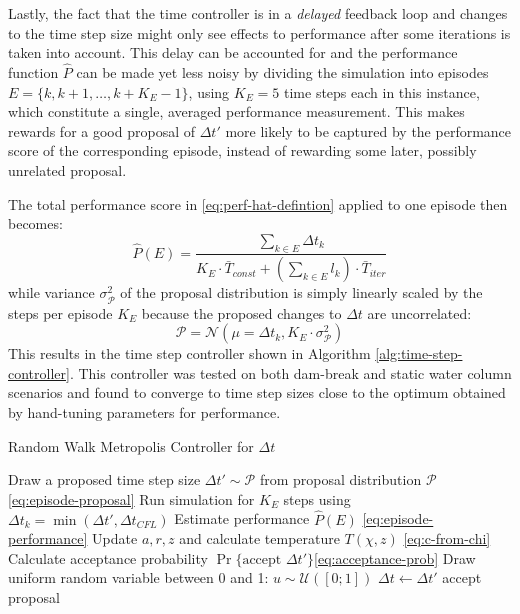 \documentclass[oneside, a4paper]{book}
\newcommand\br[1]{\left(#1\right)}
\begin{document}
    Lastly, the fact that the time controller is in a \textit{delayed} feedback loop and changes to the time step size might only see effects to performance after some iterations is taken into account. This delay can be accounted for and the performance function $\hat{P}$ can be made yet less noisy by dividing the simulation into episodes $E=\{k, k+1, \dots, k+K_{E}-1\}$, using  $K_{E}=5$ time steps each in this instance, which constitute a single, averaged performance measurement. This makes rewards for a good proposal of $\Delta t'$ more likely to be captured by the performance score of the corresponding episode, instead of rewarding some later, possibly unrelated proposal.
    
    The total performance score in \autoref{eq:perf-hat-defintion} applied to one episode then becomes:
    \begin{equation}\label{eq:episode-performance}
      \hat{P}\br{E} = \frac{
        \sum_{k\in E} \Delta t_k
      }{
        K_{E}\cdot \bar{T}_{const} + \br{\sum_{k\in E} l_k} \cdot \bar{T}_{iter}
      }
    \end{equation}
    while variance $\sigma^2_\mathcal{P}$ of the proposal distribution is simply linearly scaled by the steps per episode $K_E$ because the proposed changes to $\Delta t$ are uncorrelated:
    \begin{equation}\label{eq:episode-proposal}
      \mathcal{P} = \mathcal{N}\br{\mu = \Delta t_k, K_{E}\cdot\sigma^2_\mathcal{P}}
    \end{equation}
    This results in the time step controller shown in Algorithm \ref{alg:time-step-controller}. This controller was tested on both dam-break and static water column scenarios and found to converge to time step sizes close to the optimum obtained by hand-tuning parameters for performance.

    
    \begin{algorithm}
      \caption{Random Walk Metropolis Controller for $\Delta t$}
      \label{alg:time-step-controller}
      \begin{algorithmic}[1]
          \State Draw a proposed time step size $\Delta t' \sim \mathcal{P}$ from proposal distribution $\mathcal{P}$ \Comment\autoref{eq:episode-proposal}
          \State Run simulation for $K_E$ steps using $\Delta t_k=\min\br{\Delta t', \Delta t_{CFL}}$
          \State Estimate performance $\hat{P}\br{E}$ \Comment\autoref{eq:episode-performance}
          \State Update $a,r,z$ and calculate temperature $T\br{\chi,z}$ \Comment\autoref{eq:c-from-chi}
          \State Calculate acceptance probability $\Pr\{\text{accept }\Delta t'\}$\Comment\autoref{eq:acceptance-prob}
          \State Draw uniform random variable between 0 and 1: $u\sim\mathcal{U}\br{[0;1]}$
            \State $\Delta t \gets \Delta t'$ \Comment accept proposal
          \EndIf 
        \EndFor
      
      \end{algorithmic}
    \end{algorithm}
\end{document}
